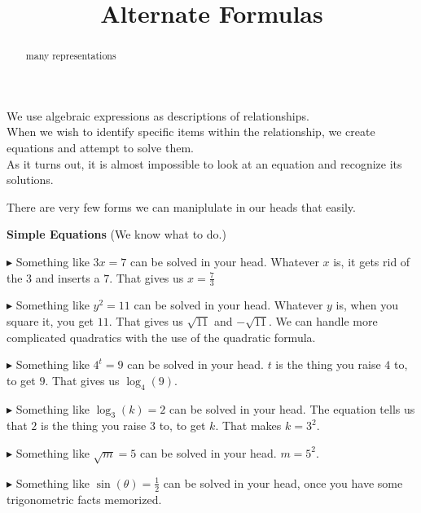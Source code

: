 \documentclass{ximera}
\title{Alternate Formulas}
\begin{document}
\begin{abstract}
many representations
\end{abstract}
\maketitle





We use algebraic expressions as descriptions of relationships. \\

When we wish to identify specific items within the relationship, we create equations and attempt to solve them. \\

As it turns out, it is almost impossible to look at an equation and recognize its solutions.


There are very few forms we can maniplulate in our heads that easily.



\begin{summary} \textbf{\textcolor{blue!75!black}{Simple Equations}}  (We know what to do.)

$\blacktriangleright$ Something like $3x = 7$ can be solved in your head.  Whatever $x$ is, it gets rid of the $3$ and inserts a $7$.  That gives us $x =\frac{7}{3}$





$\blacktriangleright$ Something like $y^2 = 11$ can be solved in your head.  Whatever $y$ is, when you square it, you get $11$.  That gives us $\sqrt{11}$ and $-\sqrt{11}$.  We can handle more complicated  quadratics with the use of the quadratic formula.




$\blacktriangleright$ Something like $4^t = 9$ can be solved in your head.  $t$ is the thing you raise $4$ to, to get $9$.  That gives us $\log_4(9)$.



$\blacktriangleright$ Something like $\log_3(k) = 2$ can be solved in your head.  The equation tells us that $2$ is the thing you raise $3$ to, to get $k$.  That makes $k = 3^2$.



$\blacktriangleright$ Something like $\sqrt{m} = 5$ can be solved in your head.  $m = 5^2$.


$\blacktriangleright$ Something like $\sin(\theta) = \frac{1}{2}$ can be solved in your head, once you have some trigonometric facts memorized.


\end{summary}
\end{document}
